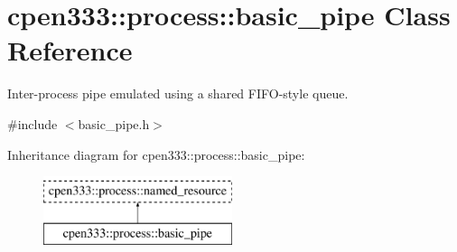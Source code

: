 \hypertarget{classcpen333_1_1process_1_1basic__pipe}{}\section{cpen333\+:\+:process\+:\+:basic\+\_\+pipe Class Reference}
\label{classcpen333_1_1process_1_1basic__pipe}


Inter-\/process pipe emulated using a shared F\+I\+F\+O-\/style queue.  




{\ttfamily \#include $<$basic\+\_\+pipe.\+h$>$}

Inheritance diagram for cpen333\+:\+:process\+:\+:basic\+\_\+pipe\+:\begin{figure}[H]
\begin{center}
\leavevmode
\includegraphics[height=2.000000cm]{classcpen333_1_1process_1_1basic__pipe}
\end{center}
\end{figure}
